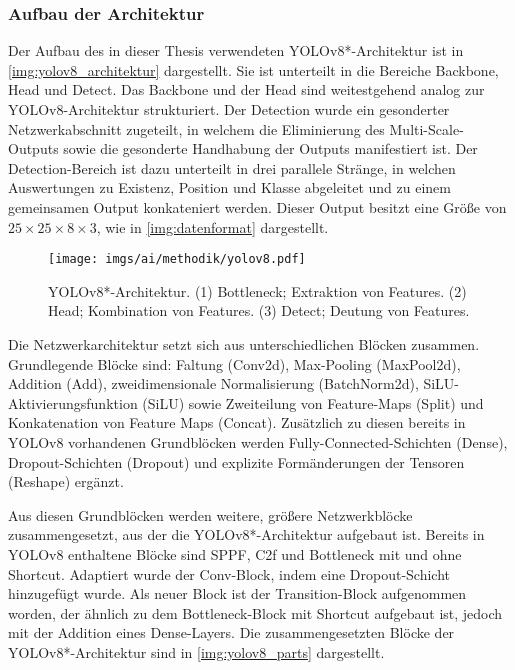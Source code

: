 \subsubsection{Aufbau der Architektur}
\label{sec:yolov8_aufbau}

Der Aufbau des in dieser Thesis verwendeten YOLOv8*-Architektur ist in \autoref{img:yolov8_architektur} dargestellt. Sie ist unterteilt in die Bereiche Backbone, Head und Detect. Das Backbone und der Head sind weitestgehend analog zur YOLOv8-Architektur strukturiert. Der Detection wurde ein gesonderter Netzwerkabschnitt zugeteilt, in welchem die Eliminierung des Multi-Scale-Outputs sowie die gesonderte Handhabung der Outputs manifestiert ist. Der Detection-Bereich ist dazu unterteilt in drei parallele Stränge, in welchen Auswertungen zu Existenz, Position und Klasse abgeleitet und zu einem gemeinsamen Output konkateniert werden. Dieser Output besitzt eine Größe von $25 \times 25 \times 8 \times 3$, wie in \autoref{img:datenformat} dargestellt.

\begin{figure}
    \centering
    \texttt{[image: imgs/ai/methodik/yolov8.pdf]}
    \caption{YOLOv8*-Architektur. (1) Bottleneck; Extraktion von Features. (2) Head; Kombination von Features. (3) Detect; Deutung von Features.}
    \label{img:yolov8_architektur}
\end{figure}

Die Netzwerkarchitektur setzt sich aus unterschiedlichen Blöcken zusammen. Grundlegende Blöcke sind: Faltung (Conv2d), Max-Pooling (MaxPool2d), Addition (Add), zweidimensionale Normalisierung (BatchNorm2d), SiLU-Aktivierungsfunktion (SiLU) sowie Zweiteilung von Feature-Maps (Split) und Konkatenation von Feature Maps (Concat). Zusätzlich zu diesen bereits in YOLOv8 vorhandenen Grundblöcken werden Fully-Connected-Schichten (Dense), Dropout-Schichten (Dropout) und explizite Formänderungen der Tensoren (Reshape) ergänzt.

Aus diesen Grundblöcken werden weitere, größere Netzwerkblöcke zusammengesetzt, aus der die YOLOv8*-Architektur aufgebaut ist. Bereits in YOLOv8 enthaltene Blöcke sind SPPF, C2f und Bottleneck mit und ohne Shortcut. Adaptiert wurde der Conv-Block, indem eine Dropout-Schicht hinzugefügt wurde. Als neuer Block ist der Transition-Block aufgenommen worden, der ähnlich zu dem Bottleneck-Block mit Shortcut aufgebaut ist, jedoch mit der Addition eines Dense-Layers. Die zusammengesetzten Blöcke der YOLOv8*-Architektur sind in \autoref{img:yolov8_parts} dargestellt.

